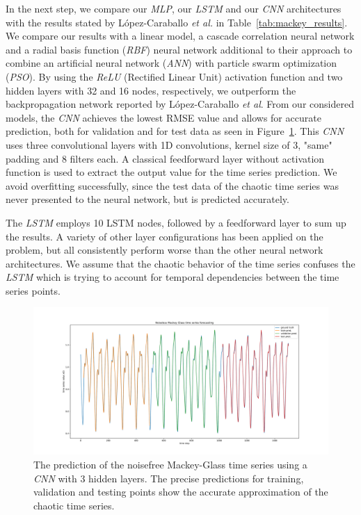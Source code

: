 \documentclass{article}
\begin{document}
In the next step, we compare our \emph{MLP}, our \emph{LSTM} and our \emph{CNN}
architectures with the results stated by López-Caraballo \textit{et al.}
\cite{lopez2016} in Table~\ref{tab:mackey_results}. We
compare our results with a linear model, a cascade correlation neural network
and a radial basis function (\emph{RBF})
neural network additional to their approach to
combine an artificial neural network (\emph{ANN}) with particle swarm
optimization (\emph{PSO}). By
using the \emph{ReLU} (Rectified Linear Unit) activation function and two
hidden layers with 32 and 16 nodes, respectively, we outperform the
backpropagation network reported by López-Caraballo \textit{et al}.
From our considered models, the \emph{CNN} achieves the lowest RMSE value and
allows for accurate prediction, both for validation and for test data as seen
in Figure~\ref{fig:mackey_pred}. This \emph{CNN} uses three convolutional layers
with 1D convolutions, kernel size of 3, "same" padding and 8
filters each. A classical
feedforward layer without activation function is used to extract the output
value for the time series prediction. We avoid overfitting successfully, since
the test data of the chaotic time series was never presented to the neural
network, but is predicted accurately.

The \emph{LSTM} employs 10 LSTM nodes, followed by a feedforward layer to sum up
the results. A variety of other layer configurations has been applied
on the problem,
but all consistently perform worse than the other neural network architectures.
We assume that the chaotic behavior of the time series confuses the \emph{LSTM}
which is trying to account for temporal dependencies between the time series
points.

\begin{figure}
    \centering
    \includegraphics[width=\textwidth]{figures/mg_pred_cnn.pdf}
    \caption{The prediction of the noisefree Mackey-Glass time series using a
        \emph{CNN} with $3$ hidden layers.
        The precise predictions for training, validation and testing
        points show the accurate approximation of the chaotic time series.}
    \label{fig:mackey_pred}
\end{figure}
\end{document}
